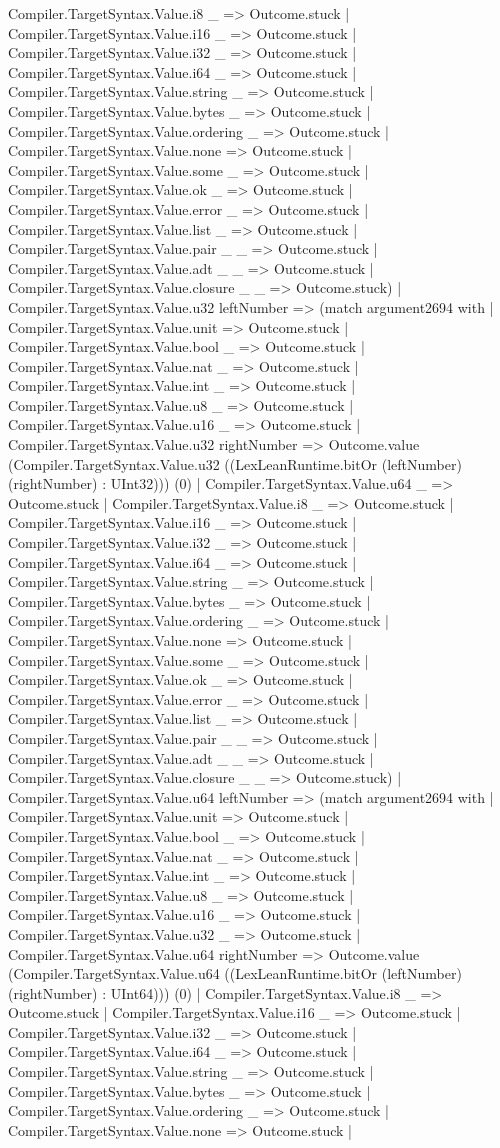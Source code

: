 \documentclass[11pt]{article}
\begin{document}
Compiler.TargetSyntax.Value.i8 \_ => Outcome.stuck | Compiler.TargetSyntax.Value.i16 \_ => Outcome.stuck | Compiler.TargetSyntax.Value.i32 \_ => Outcome.stuck | Compiler.TargetSyntax.Value.i64 \_ => Outcome.stuck | Compiler.TargetSyntax.Value.string \_ => Outcome.stuck | Compiler.TargetSyntax.Value.bytes \_ => Outcome.stuck | Compiler.TargetSyntax.Value.ordering \_ => Outcome.stuck | Compiler.TargetSyntax.Value.none => Outcome.stuck | Compiler.TargetSyntax.Value.some \_ => Outcome.stuck | Compiler.TargetSyntax.Value.ok \_ => Outcome.stuck | Compiler.TargetSyntax.Value.error \_ => Outcome.stuck | Compiler.TargetSyntax.Value.list \_ => Outcome.stuck | Compiler.TargetSyntax.Value.pair \_ \_ => Outcome.stuck | Compiler.TargetSyntax.Value.adt \_ \_ => Outcome.stuck | Compiler.TargetSyntax.Value.closure \_ \_ => Outcome.stuck) | Compiler.TargetSyntax.Value.u32 leftNumber => (match argument2694 with | Compiler.TargetSyntax.Value.unit => Outcome.stuck | Compiler.TargetSyntax.Value.bool \_ => Outcome.stuck | Compiler.TargetSyntax.Value.nat \_ => Outcome.stuck | Compiler.TargetSyntax.Value.int \_ => Outcome.stuck | Compiler.TargetSyntax.Value.u8 \_ => Outcome.stuck | Compiler.TargetSyntax.Value.u16 \_ => Outcome.stuck | Compiler.TargetSyntax.Value.u32 rightNumber => Outcome.value (Compiler.TargetSyntax.Value.u32 ((LexLeanRuntime.bitOr (leftNumber) (rightNumber) : UInt32))) (0) | Compiler.TargetSyntax.Value.u64 \_ => Outcome.stuck | Compiler.TargetSyntax.Value.i8 \_ => Outcome.stuck | Compiler.TargetSyntax.Value.i16 \_ => Outcome.stuck | Compiler.TargetSyntax.Value.i32 \_ => Outcome.stuck | Compiler.TargetSyntax.Value.i64 \_ => Outcome.stuck | Compiler.TargetSyntax.Value.string \_ => Outcome.stuck | Compiler.TargetSyntax.Value.bytes \_ => Outcome.stuck | Compiler.TargetSyntax.Value.ordering \_ => Outcome.stuck | Compiler.TargetSyntax.Value.none => Outcome.stuck | Compiler.TargetSyntax.Value.some \_ => Outcome.stuck | Compiler.TargetSyntax.Value.ok \_ => Outcome.stuck | Compiler.TargetSyntax.Value.error \_ => Outcome.stuck | Compiler.TargetSyntax.Value.list \_ => Outcome.stuck | Compiler.TargetSyntax.Value.pair \_ \_ => Outcome.stuck | Compiler.TargetSyntax.Value.adt \_ \_ => Outcome.stuck | Compiler.TargetSyntax.Value.closure \_ \_ => Outcome.stuck) | Compiler.TargetSyntax.Value.u64 leftNumber => (match argument2694 with | Compiler.TargetSyntax.Value.unit => Outcome.stuck | Compiler.TargetSyntax.Value.bool \_ => Outcome.stuck | Compiler.TargetSyntax.Value.nat \_ => Outcome.stuck | Compiler.TargetSyntax.Value.int \_ => Outcome.stuck | Compiler.TargetSyntax.Value.u8 \_ => Outcome.stuck | Compiler.TargetSyntax.Value.u16 \_ => Outcome.stuck | Compiler.TargetSyntax.Value.u32 \_ => Outcome.stuck | Compiler.TargetSyntax.Value.u64 rightNumber => Outcome.value (Compiler.TargetSyntax.Value.u64 ((LexLeanRuntime.bitOr (leftNumber) (rightNumber) : UInt64))) (0) | Compiler.TargetSyntax.Value.i8 \_ => Outcome.stuck | Compiler.TargetSyntax.Value.i16 \_ => Outcome.stuck | Compiler.TargetSyntax.Value.i32 \_ => Outcome.stuck | Compiler.TargetSyntax.Value.i64 \_ => Outcome.stuck | Compiler.TargetSyntax.Value.string \_ => Outcome.stuck | Compiler.TargetSyntax.Value.bytes \_ => Outcome.stuck | Compiler.TargetSyntax.Value.ordering \_ => Outcome.stuck | Compiler.TargetSyntax.Value.none => Outcome.stuck | 
\end{document}

